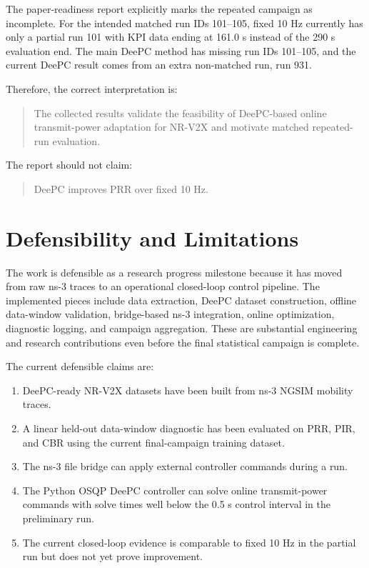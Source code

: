 \documentclass[11pt]{article}
\newcommand{\deePC}{DeePC}
\begin{document}
The paper-readiness report explicitly marks the repeated campaign as
incomplete. For the intended matched run IDs 101--105, fixed 10 Hz currently
has only a partial run 101 with KPI data ending at 161.0 s instead of the
290 s evaluation end. The main \deePC{} method has missing run IDs 101--105,
and the current \deePC{} result comes from an extra non-matched run, run 931.

Therefore, the correct interpretation is:

\begin{quote}
The collected results validate the feasibility of \deePC-based online
transmit-power adaptation for NR-V2X and motivate matched repeated-run
evaluation.
\end{quote}

The report should not claim:

\begin{quote}
\deePC{} improves PRR over fixed 10 Hz.
\end{quote}

\section{Defensibility and Limitations}

The work is defensible as a research progress milestone because it has moved
from raw ns-3 traces to an operational closed-loop control pipeline. The
implemented pieces include data extraction, \deePC{} dataset construction,
offline data-window validation, bridge-based ns-3 integration, online optimization,
diagnostic logging, and campaign aggregation. These are substantial engineering
and research contributions even before the final statistical campaign is
complete.

The current defensible claims are:
\begin{enumerate}
    \item \deePC-ready NR-V2X datasets have been built from ns-3 NGSIM mobility traces.
    \item A linear held-out data-window diagnostic has been evaluated on PRR, PIR, and CBR using the current final-campaign training dataset.
    \item The ns-3 file bridge can apply external controller commands during a run.
    \item The Python OSQP \deePC{} controller can solve online transmit-power commands with solve times well below the 0.5 s control interval in the preliminary run.
    \item The current closed-loop evidence is comparable to fixed 10 Hz in the partial run but does not yet prove improvement.
\end{enumerate}
\end{document}
